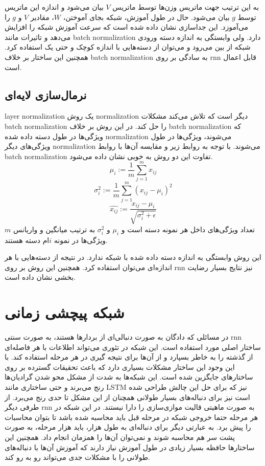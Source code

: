 به این ترتیب جهت ماتریس وزن‌ها توسط ماتریس $V$ بیان می‌شود و اندازه این ماتریس
توسط $g$ بیان می‌شود. حال در طول آموزش، شبکه بجای آموختن، $W$، مقادیر $V$ و $g$
را می‌آموزد. این جداسازی نشان داده شده است که سرعت آموزش شبکه را افزایش می‌دهد و
تاثیرات مانند \gls{batch normalization} دارد. ولی وابستگی به اندازه دسته ورودی
شبکه از بین می‌رود و می‌توان از دسته‌هایی با اندازه کوچک و حتی یک استفاده کرد.
همچنین این ساختار بر خلاف \gls{batch normalization} به سادگی بر روی \gls{rnn}
قابل اعمال است.

\subsection{نرمال‌سازی لایه‌ای}
\gls{layer normalization}\cite{ba2016layer} یک روش \gls{normalization} دیگر است
که تلاش می‌کند مشکلات \gls{batch normalization} را حل کند. در این روش بر خلاف
\gls{batch normalization} که ویژگی‌ها در طول دسته داده شده \gls{normalization}
می‌شوند، ویژگی‌ها در طول ویژگی‌های دیگر \gls{normalization} می‌شوند. با توجه به
روابط زیر و مقایسه آن‌ها با روابط \gls{batch normalization} تفاوت این دو روش به
خوبی نشان داده می‌شود.
\begin{equation}
    \mu_i := \frac{1}{m} \sum_{j=1}^{m}x_{ij}
\end{equation}
\begin{equation}
    \sigma_i^2 := \frac{1}{m} \sum_{j=1}^{m}(x_{ij} - \mu_i)^2
\end{equation}
\begin{equation}
    \hat{x_{ij}} := \frac{x_{ij} - \mu_i}{\sqrt{\sigma_i^2 + \epsilon}}
\end{equation}
$m$ تعداد ویژگی‌های داخل هر نمونه دسته است و $\mu_i$ و $\sigma_i^2$ به ترتیب
میانگین و واریانس ویژگی‌ها در نمونه $i$ام دسته هستند.

این روش وابستگی به اندازه دسته داده شده با شبکه ندارد. در نتیجه از دسته‌هایی با
هر اندازه‌ای می‌توان استفاده کرد. همچنین این روش بر روی \gls{rnn} نیز نتایج
بسیار رضایت بخشی نشان داده است.

\section{شبکه پیچشی زمانی}
در مسائلی که دادگان به صورت دنبالی‌ای از بردارها هستند، به صورت سنتی \gls{rnn}
ساختار اصلی مورد استفاده است. این شبکه در تئوری می‌تواند اطلاعات با هر فاصله‌ای
از گذشته را به خاطر بسپارد و از آن‌ها برای نتیجه گیری در هر مرحله استفاده کند.
با این وجود این ساختار مشکلات بسیاری دارد که باعث تحقیقات گسترده بر روی
ساختارهای جایگزین شده است. این شبکه‌ها به شدت از مشکل محو شدن گرادیان‌ها رنج
می‌برند و حتی ساختاری مانند \gls{LSTM} نیز که برای حل این چالش طراحی شده است نیز
برای دنباله‌های بسیار طولانی همچنان از این مشکل تا حدی رنج می‌برد. از طرفی دیگر
\gls{rnn} به صورت ماهیتی قالیت موازی‌سازی را دارا نیستند. در این شبکه در هر
مرحله حتما خروجی شبکه در مرحله قبل باید محاسبه شده باشد تا بتوان محاسبات را پیش
برد. به عبارتی دیگر برای دنباله‌ای به طول هزار، باید هزار مرحله، به صورت پشت سر
هم محاسبه شوند و نمی‌توان آن‌ها را همزمان انجام داد. همچنین این ساختارها حافظه
بسیار زیادی در طول آموزش نیاز دارند که آموزش آن‌ها با دنباله‌های طولانی را با
مشکلات جدی می‌تواند رو به رو کند.

